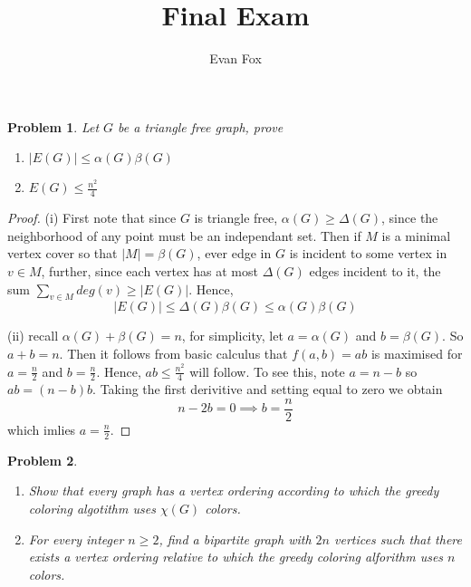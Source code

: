 \documentclass{article}
\title{Final Exam}
\author{Evan Fox}
\date{}
\newtheorem{prb}{Problem}
\begin{document}
\maketitle
	\begin{prb}
	    	Let $G$ be a triangle free graph, prove 
		\begin{enumerate}
			\item $|E(G)| \leq \alpha(G) \beta(G)$
				\item $E(G) \leq \frac{n^2}{4} $
		\end{enumerate}
	    \end{prb}
	    \begin{proof}
		    (i) First note that since $G$ is triangle free, $\alpha(G) \geq \Delta(G)$, since the neighborhood of any point must 
		    be an independant set. Then if $M$ is a minimal vertex cover so that $|M| = \beta(G)$, ever edge in 
		    $G$ is incident to some vertex in $v \in M$, further, since each vertex has at most $\Delta(G)$ edges incident to it, 
		    the sum $ \sum_{v \in M} deg(v) \geq |E(G)|$. Hence, 
		    \[
		    	|E(G)| \leq \Delta(G) \beta(G) \leq \alpha(G) \beta(G)
		    \]
		
		    (ii) recall $\alpha(G) + \beta(G) = n$, for simplicity, let $a = \alpha(G)$ and $ b= \beta(G)$. So $a + b = n$. Then it follows from basic 
			calculus that $f(a, b) = ab$ is maximised for $a = \frac{n}{2} $ and $b = \frac{n}{2} $. Hence, $ab \leq \frac{n^2}{4} $ will follow. 
			To see this, note $a = n -b$ so $ab = (n - b)b$. Taking the first derivitive and setting equal to zero we obtain 
			\[
				n - 2b = 0 \implies b = \frac{n}{2} 
			\]
			which imlies $a = \frac{n}{2} $. 
	    \end{proof}


	    \begin{prb}
	    	\begin{enumerate}
	    		\item Show that every graph has a vertex ordering according to which the greedy coloring algotithm uses $\chi (G)$ colors. 
			\item  For every integer $n \geq 2$, find a bipartite graph with $2n$ vertices such that there exists a vertex ordering relative to which the greedy coloring alforithm uses $n$ colors. 
	    	\end{enumerate}
	    \end{prb}
\end{document}
